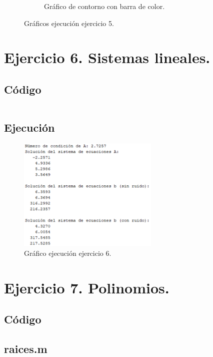 \documentclass[a4paper, 12pt]{article}
\begin{document}
\begin{figure}[ht]
\begin{subfigure}{0.49\textwidth}
			\caption{Gráfico de contorno con barra de color.}
			\label{grafica5.3}
		\end{subfigure}
		\caption{Gráficos ejecución ejercicio 5.}
		\label{graficos5}
	\end{figure}
	
	\section{Ejercicio 6. Sistemas lineales.}
	
	\subsection{Código}
	\inputminted[fontsize=\scriptsize, linenos, breaklines=true, xleftmargin=0.75cm, frame=lines]{matlab}{code/Ejercicio6.m}
	\subsection{Ejecución}
	\begin{figure}[htp!]
		\centering
		\includegraphics[width=0.6\textwidth]{figures/ejc6.png}
		\caption{Gráfico ejecución ejercicio 6.}
	\end{figure}
	
	\section{Ejercicio 7. Polinomios.}
	
	\subsection{Código}
	\subsection*{raices.m}
	\inputminted[fontsize=\scriptsize, linenos, breaklines=true, xleftmargin=0.75cm, frame=lines]{matlab}{code/raices.m}
	\inputminted[fontsize=\scriptsize, linenos, breaklines=true, xleftmargin=0.75cm, frame=lines]{matlab}{code/Ejercicio7.m}
\end{document}

